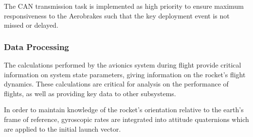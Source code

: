 The CAN transmission task is implemented as high priority to ensure maximum responsiveness to the Aerobrakes such that the key deployment event is not missed or delayed.

\subsubsection{Data Processing}
The calculations performed by the avionics system during flight provide critical information on system state parameters, giving information on the rocket's flight dynamics. These calculations are critical for analysis on the performance of flights, as well as providing key data to other subsystems.

In order to maintain knowledge of the rocket's orientation relative to the earth's frame of reference, gyroscopic rates are integrated into attitude quaternions which are applied to the initial launch vector.

